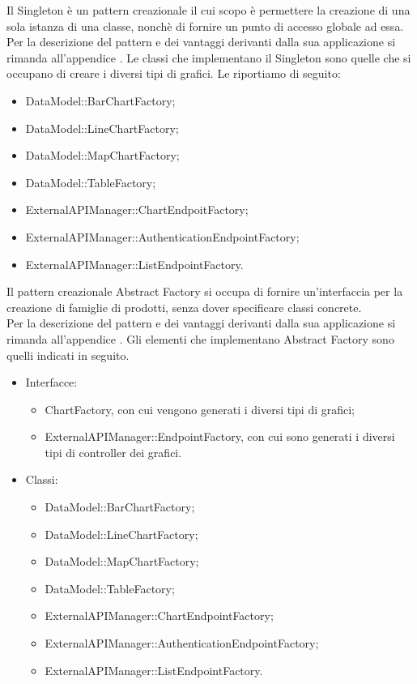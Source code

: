 				Il Singleton è un pattern creazionale il cui scopo è permettere la creazione di una sola istanza di una classe, nonchè di fornire un punto di accesso globale ad essa.\\
				Per la descrizione del pattern e dei vantaggi derivanti dalla sua applicazione si rimanda all'appendice .
					Le classi che implementano il Singleton sono quelle che si occupano di creare i diversi tipi di grafici. Le riportiamo di seguito:
					\begin{itemize}
						\item DataModel::BarChartFactory;
						\item DataModel::LineChartFactory;
						\item DataModel::MapChartFactory;
						\item DataModel::TableFactory;
						\item ExternalAPIManager::ChartEndpoitFactory;
						\item ExternalAPIManager::AuthenticationEndpointFactory;
						\item ExternalAPIManager::ListEndpointFactory.
					\end{itemize}
				Il pattern creazionale Abstract Factory si occupa di fornire un'interfaccia per la creazione di famiglie di prodotti, senza dover specificare classi concrete.\\
				Per la descrizione del pattern e dei vantaggi derivanti dalla sua applicazione si rimanda all'appendice .
					Gli elementi che implementano Abstract Factory sono quelli indicati in seguito.
					\begin{itemize}
					\item Interfacce:
						\begin{itemize}
							\item ChartFactory, con cui vengono generati i diversi tipi di grafici;
							\item ExternalAPIManager::EndpointFactory, con cui sono generati i diversi tipi di controller dei grafici.
						\end{itemize}
					\item Classi:
						\begin{itemize}
							\item DataModel::BarChartFactory;
							\item DataModel::LineChartFactory;
							\item DataModel::MapChartFactory;
							\item DataModel::TableFactory;
							\item ExternalAPIManager::ChartEndpointFactory;
							\item ExternalAPIManager::AuthenticationEndpointFactory;
							\item ExternalAPIManager::ListEndpointFactory.
						\end{itemize}
					\end{itemize}
					

